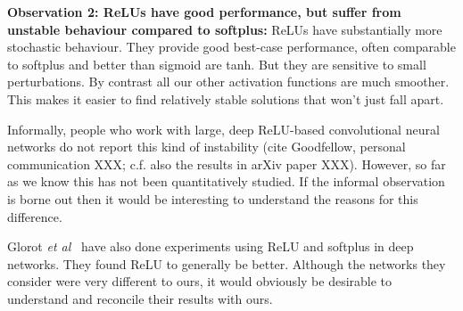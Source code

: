 \documentclass[10pt]{article}
\begin{document}
\textbf{Observation 2: ReLUs have good performance, but suffer from
  unstable behaviour compared to softplus:} ReLUs have substantially
more stochastic behaviour.  They provide good best-case performance,
often comparable to softplus and better than sigmoid are tanh.  But
they are sensitive to small perturbations.  By contrast all our other
activation functions are much smoother.  This makes it easier to find
relatively stable solutions that won't just fall apart.

Informally, people who work with large, deep ReLU-based convolutional
neural networks do not report this kind of instability (cite
Goodfellow, personal communication XXX; c.f. also the results in arXiv
paper XXX).  However, so far as we know this has not been
quantitatively studied.  If the informal observation is borne out then
it would be interesting to understand the reasons for this difference.

Glorot \emph{et al}~\cite{Glorot2010a} have also done experiments
using ReLU and softplus in deep networks.  They found ReLU to
generally be better.  Although the networks they consider were very
different to ours, it would obviously be desirable to understand and
reconcile their results with ours.
\end{document}
